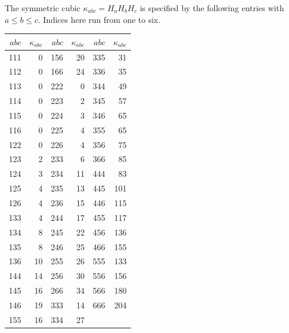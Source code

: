 The symmetric cubic $\kappa_{abc}=H_aH_bH_c$ is specified by the
following entries with $a\le b\le c$. Indices here run from one to six.
\begin{center}\small
\begin{tabular}{rr@{\qquad}rr@{\qquad}rr}
\toprule
$abc$&$\kappa_{abc}$&$abc$&$\kappa_{abc}$&$abc$&$\kappa_{abc}$\\
\midrule
111&0&156&20&335&31\\
112&0&166&24&336&35\\
113&0&222&0&344&49\\
114&0&223&2&345&57\\
115&0&224&3&346&65\\
116&0&225&4&355&65\\
122&0&226&4&356&75\\
123&2&233&6&366&85\\
124&3&234&11&444&83\\
125&4&235&13&445&101\\
126&4&236&15&446&115\\
133&4&244&17&455&117\\
134&8&245&22&456&136\\
135&8&246&25&466&155\\
136&10&255&26&555&133\\
144&14&256&30&556&156\\
145&16&266&34&566&180\\
146&19&333&14&666&204\\
155&16&334&27&&\\
\bottomrule
\end{tabular}\end{center}

